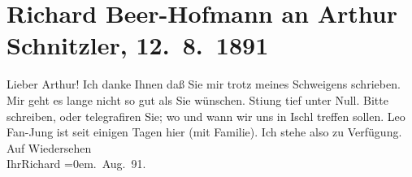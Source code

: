 

         
         \renewcommand{\erwaehntePersonen}{Personen: Leo Van-Jung}
         \renewcommand{\erwaehnteOrte}{Orte: Bad Aussee, Bad Ischl}
         \renewcommand{\erwaehnteWerke}{}
               \section[Richard Beer-Hofmann an Arthur Schnitzler, 12. 8. 1891]{ Richard Beer-Hofmann an Arthur Schnitzler, 12. 8. 1891}\nopagebreak{}\rehead{ }\begin{ledgroupsized}[t]{13cm}\normalsize\beginnumbering \toendnotes[C]{\smallbreak\pagebreak[2]} 
\pstart
           \noindent{}{\pb}Lieber Arthur! \hspace*{2em}Ich danke Ihnen daß Sie mir trotz meines Schweigens
               schrieben. Mir geht es lange nicht so gut als Sie wünschen. Sti{\geminationm}ung tief unter Null. Bitte schreiben, oder telegrafiren
               Sie; wo und wann wir uns in Ischl treffen sollen.
                  Leo Fan-Jung ist seit einigen Tagen hier (mit Familie). Ich stehe also zu
               Verfügung.\pend
           \pstart
           Auf Wiedersehen{\\[\baselineskip]}Ihr\spacefill\mbox{Richard}\pend
           \leftskip=0em{}. Aug. 91.\pend
           
         
         \endnumbering{}\end{ledgroupsized}  \newcommand{\dateiname}{L00031}\newcommand{\titel}{Richard Beer-Hofmann an Arthur Schnitzler, 12. 8. 1891}\newcommand{\editorInnen}{Martin Anton Müller und Gerd-Hermann Susen}
      